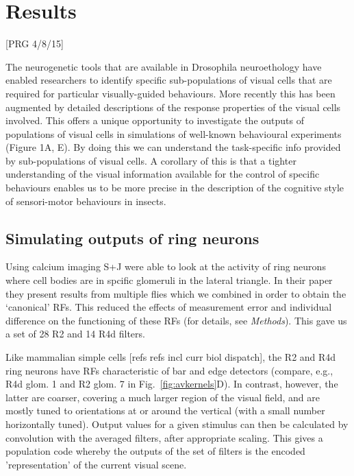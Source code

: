 \section{Results}
[PRG 4/8/15] 

The neurogenetic tools that are available in Drosophila neuroethology have enabled researchers to identify specific sub-populations of visual cells that are required for particular visually-guided behaviours. More recently this has been augmented by detailed descriptions of the response properties of the visual cells involved. This offers a unique opportunity to investigate the outputs of populations of visual cells in simulations of well-known behavioural experiments (Figure 1A, E). By doing this we can understand the task-specific info provided by sub-populations of visual cells. A corollary of this is that a tighter understanding of the visual information available for the control of specific behaviours enables us to be more precise in the description of the cognitive style of sensori-motor behaviours in insects. 

\subsection{Simulating outputs of ring neurons}
\label{sec:results:bar}
Using calcium imaging S+J were able to look at the activity of ring neurons where cell bodies are in spcific glomeruli in the lateral triangle. In their paper they present results from multiple flies which we
combined \cite{Seelig2013} in order to obtain the `canonical' RFs. This reduced the effects of measurement error and individual difference on the functioning of these RFs (for details, see \emph{Methods}). This gave us a set of 28 R2 and 14 R4d filters.

Like mammalian simple cells [refs refs incl curr biol dispatch], the R2 and R4d ring neurons have RFs characteristic of bar and edge detectors (compare, e.g., R4d glom. 1 and R2 glom. 7 in Fig.~\ref{fig:avkernels}D).
In contrast, however, the latter are coarser, covering a much larger region of the visual field, and are mostly tuned to orientations at or around the vertical (with a small number horizontally tuned). Output values for a given stimulus can then be calculated by convolution with the averaged filters, after appropriate scaling. This gives a population code whereby the outputs of the set of filters is the encoded 'representation' of the current visual scene.


